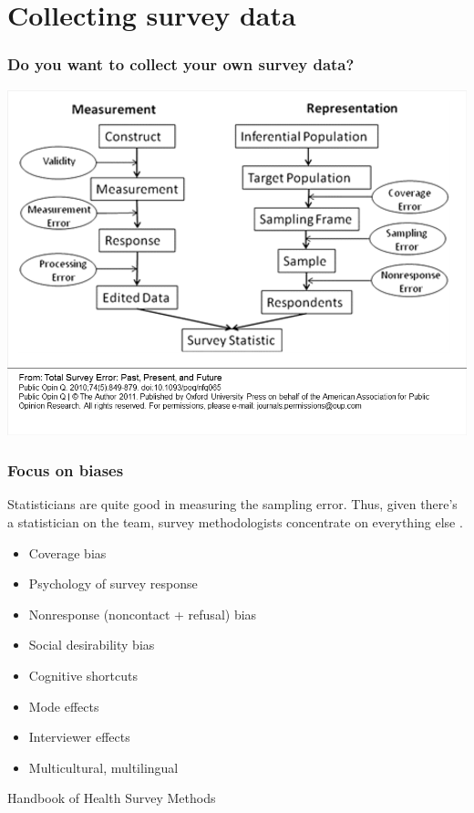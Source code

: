\documentclass{beamer}
\begin{document}
\section{Collecting survey data}

\begin{frame}\frametitle{Do you want to collect your own survey data?}

\centering

\includegraphics[scale=0.44]{tse-slide}

\end{frame}

\begin{frame}\frametitle{Focus on biases}

Statisticians are quite good in measuring the sampling error. Thus,
given there's a statistician on the team,
survey methodologists concentrate on everything else
\citep{grov:fowl:coup:lepk:sing:tour:2009,groves:lyberg:2010}.

\begin{itemize}
    \item Coverage bias
    \item Psychology of survey response
    \item Nonresponse (noncontact + refusal) bias
    \item Social desirability bias
    \item Cognitive shortcuts
    \item Mode effects
    \item Interviewer effects
    \item Multicultural, multilingual
\end{itemize}

Handbook of Health Survey Methods \citep{johnson:2015:handbook}

\end{frame}
\end{document}
